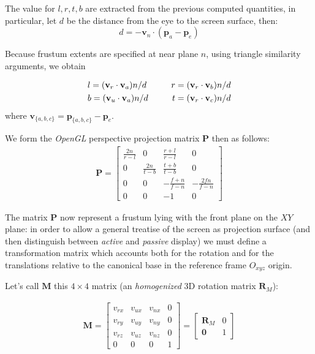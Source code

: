 \documentclass[acmtocl,acmnow]{acmtrans2m}
\begin{document}
The value for $l,r,t,b$ are extracted from the previous computed quantities, in
particular, let $d$ be the distance from the eye to the screen surface, then:
\begin{equation}
 d = - \mathbf{v}_n \cdot ( \mathbf{p}_a -\mathbf{p}_e )
\end{equation}

Because frustum extents are specified at near plane $n$, using triangle
similarity arguments, we obtain

\begin{eqnarray}
& l = (\mathbf{v}_r \cdot \mathbf{v}_a ) n /d &\hspace{6mm} r = (\mathbf{v}_r
\cdot \mathbf{v}_b ) n /d \nonumber \\
& b = (\mathbf{v}_u \cdot \mathbf{v}_a ) n /d &\hspace{6mm} t = (\mathbf{v}_r
\cdot \mathbf{v}_c ) n /d 
\end{eqnarray}
where $\mathbf{v}_{\{a,b,c\}} = \mathbf{p}_{\{a,b,c\}}-\mathbf{p}_e$.

We form the \emph{OpenGL} perspective projection matrix $\mathbf{P}$ then as
follows:
\begin{align*}
\mathbf{P}= \begin{bmatrix}
\frac{2n}{r-l} & 0 & \frac{r+l}{r-l} & 0 \\ 
0 & \frac{2n}{t-b} & \frac{t+b}{t-b} & 0 \\ 
0 & 0 & -\frac{f+n}{f-n} & -\frac{2fn}{f-n} \\ 
0 & 0 & -1 & 0 
\end{bmatrix}
\end{align*}

The matrix $\mathbf{P}$ now represent a frustum lying with the front plane on
the $XY$ plane: in order to allow a general treatise of the screen as projection
surface (and then distinguish between \emph{active} and \emph{passive} display) we must define a transformation matrix which 
accounts both for the rotation and for the translations relative to the canonical base in the reference
frame $O_{xyz}$ origin.

Let's call $\mathbf{M}$ this $4 \times 4$ matrix (an \emph{homogenized} 3D
rotation matrix $\mathbf{R}_M$):

\begin{align*}
\mathbf{M} =
\begin{bmatrix}
v_{rx} & v_{ux} & v_{nx} & 0 \\
v_{ry} & v_{uy} & v_{ny} & 0 \\
v_{rz} & v_{uz} & v_{nz} & 0 \\
0 & 0 & 0 & 1
\end{bmatrix}
=
\begin{bmatrix}
\mathbf{R}_M & 0 \\
\mathbf{0} & 1 
\end{bmatrix}
\end{align*}
\end{document}
